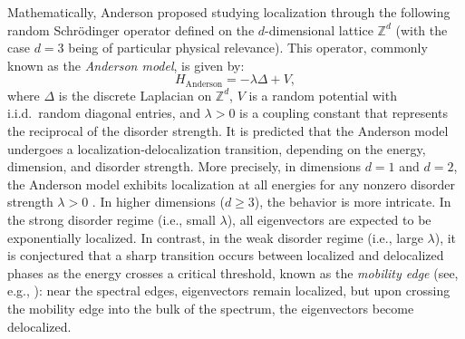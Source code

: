 \documentclass[10pt,reqno]{amsart}
\numberwithin{equation}{section}
\numberwithin{figure}{section}
\theoremstyle{plain} %
\theoremstyle{definition} %
\newcommand{\Z}{\mathbb{Z}}
\newcommand{\be}{\begin{equation}}
\newcommand{\ee}{\end{equation}}
\numberwithin{equation}{section}
\begin{document}
Mathematically, Anderson \cite{PhysRev.109.1492} proposed studying localization through the following random Schr{\"o}dinger operator defined on the $d$-dimensional lattice $\Z^d$ (with the case $d=3$ being of particular physical relevance). This operator, commonly known as the \emph{Anderson model}, is given by:
\be\label{eq;Anderson}
H_{\mathrm{Anderson}}=-\lambda\Delta+ V, 
\ee
where $\Delta$ is the discrete Laplacian on $\Z^d$, $V$ is a random potential with i.i.d.~random diagonal entries, and $\lambda>0$ is a coupling constant that represents the reciprocal of the disorder strength. It is predicted that the Anderson model undergoes a localization-delocalization transition, depending on the energy, dimension, and disorder strength. 
More precisely, in dimensions $d=1$ and $d=2$, the Anderson model exhibits localization at all energies for any nonzero disorder strength $\lambda>0$ \cite{PRL_Anderson,mott1961theory,Borland1963TheNature}. 
In higher dimensions ($d\ge 3$), the behavior is more intricate. In the strong disorder regime (i.e., small $\lambda$), all eigenvectors are expected to be exponentially localized.
In contrast, in the weak disorder regime (i.e., large $\lambda$), it is conjectured that a sharp transition occurs between localized and delocalized phases as the energy crosses a critical threshold, known as the \emph{mobility edge} (see, e.g., \cite{Aizenman_book,Kirsch2007}): near the spectral edges, eigenvectors remain localized, but upon crossing the mobility edge into the bulk of the spectrum, the eigenvectors become delocalized. 
 

\end{document}
